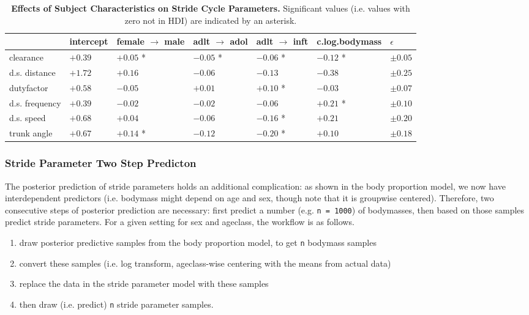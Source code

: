 \begin{table}[htbp]
\caption{\label{tab:strideresults}\textbf{Effects of Subject Characteristics on Stride Cycle Parameters.} Significant values (i.e. values with zero not in HDI) are indicated by an asterisk.}
\centering
\begin{tabular}{lllllll}
 & intercept & female \(\rightarrow\) male & adlt \(\rightarrow\) adol & adlt \(\rightarrow\) inft & c.log.bodymass & \(\epsilon\)\\[0pt]
\hline
clearance & \(+0.39\) & \(+0.05\) * & \(-0.05\) * & \(-0.06\) * & \(-0.12\) * & \(\pm 0.05\)\\[0pt]
d.s. distance & \(+1.72\) & \(+0.16\) & \(-0.06\) & \(-0.13\) & \(-0.38\) & \(\pm 0.25\)\\[0pt]
dutyfactor & \(+0.58\) & \(-0.05\) & \(+0.01\) & \(+0.10\) * & \(-0.03\) & \(\pm 0.07\)\\[0pt]
d.s. frequency & \(+0.39\) & \(-0.02\) & \(-0.02\) & \(-0.06\) & \(+0.21\) * & \(\pm 0.10\)\\[0pt]
d.s. speed & \(+0.68\) & \(+0.04\) & \(-0.06\) & \(-0.16\) * & \(+0.21\) & \(\pm 0.20\)\\[0pt]
trunk angle & \(+0.67\) & \(+0.14\) * & \(-0.12\) & \(-0.20\) * & \(+0.10\) & \(\pm 0.18\)\\[0pt]
\end{tabular}
\end{table}


\subsubsection{Stride Parameter Two Step Predicton}
\label{sec:org3879560}
The posterior prediction of stride parameters holds an additional complication: as shown in the body proportion model, we now have interdependent predictors (i.e. bodymass might depend on age and sex, though note that it is groupwise centered).
Therefore, two consecutive steps of posterior prediction are necessary: first predict a number (e.g. \texttt{n = 1000}) of bodymasses, then based on those samples predict stride parameters.
For a given setting for sex and ageclass, the workflow is as follows.
\begin{enumerate}
\item draw posterior predictive samples from the body proportion model, to get \texttt{n} bodymass samples
\item convert these samples (i.e. log transform, ageclass-wise centering with the means from actual data)
\item replace the data in the stride parameter model with these samples
\item then draw (i.e. predict) \texttt{n} stride parameter samples.
\end{enumerate}

